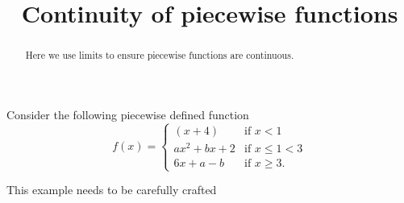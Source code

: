 \documentclass{ximera}
\title[Dig-In:]{Continuity of piecewise functions}
\begin{document}
\begin{abstract}
Here we use limits to ensure piecewise functions are continuous.
\end{abstract}
\maketitle

Consider the following piecewise defined function
\[
f(x) = 
\begin{cases}
  (x+4) & \text{if $x<1$}\\
  ax^2 + bx + 2 & \text{if $x\le 1<3$}\\
  6x+a-b & \text{if $x\ge 3$}.
\end{cases}
\]  

This example needs to be carefully crafted
\end{document}

